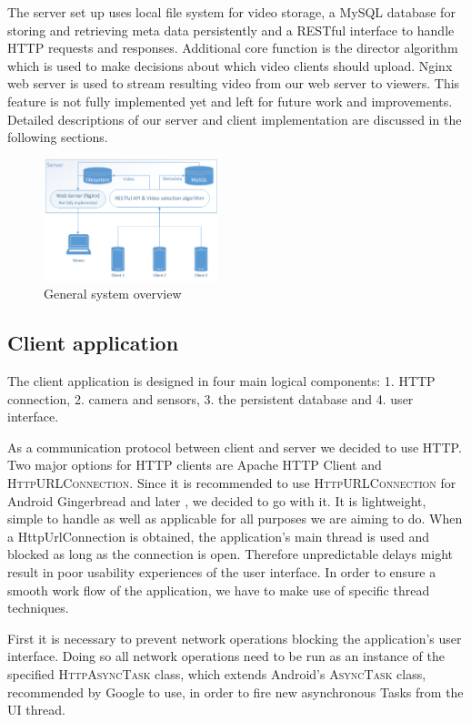\documentclass[conference]{IEEEtran}
\begin{document}
The server set up uses local file system for video storage, a MySQL database for storing and retrieving meta data persistently and a RESTful interface to handle HTTP requests and responses.
Additional core function is the director algorithm which is used to make decisions about which video clients should upload.
Nginx web server is used to stream resulting video from our web server to viewers.
This feature is not fully implemented yet and left for future work and improvements.
Detailed descriptions of our server and client implementation are discussed in the following sections.

\begin{figure}[!t]
	\centering
	\includegraphics[width=0.45\textwidth]{sys_arch.png}
	\caption{General system overview}
	\label{fig:gen_arch}
\end{figure}

\subsection{Client application}

The client application is designed in four main logical components: 1. HTTP connection, 2. camera and sensors, 3. the persistent database and 4. user interface.

As a communication protocol between client and server we decided to use HTTP.
Two major options for HTTP clients are Apache HTTP Client and \textsc{HttpURLConnection}.
Since it is recommended to use \textsc{HttpURLConnection} for Android Gingerbread and later \cite{jesse_wilson_androids},
we decided to go with it.
It is lightweight, simple to handle as well as applicable for all purposes we are aiming to do.
When a HttpUrlConnection is obtained, the application's main thread is used and blocked as long as the connection is open.
Therefore unpredictable delays might result in poor usability experiences of the user interface.
In order to ensure a smooth work flow of the application, we have to make use of specific thread techniques.

First it is necessary to prevent network operations blocking the application's user interface.
Doing so all network operations need to be run as an instance 
of the specified \textsc{HttpAsyncTask} class, which extends Android's \textsc{AsyncTask} class, recommended by Google to use, in order to fire new asynchronous Tasks from the UI thread.
\end{document}
